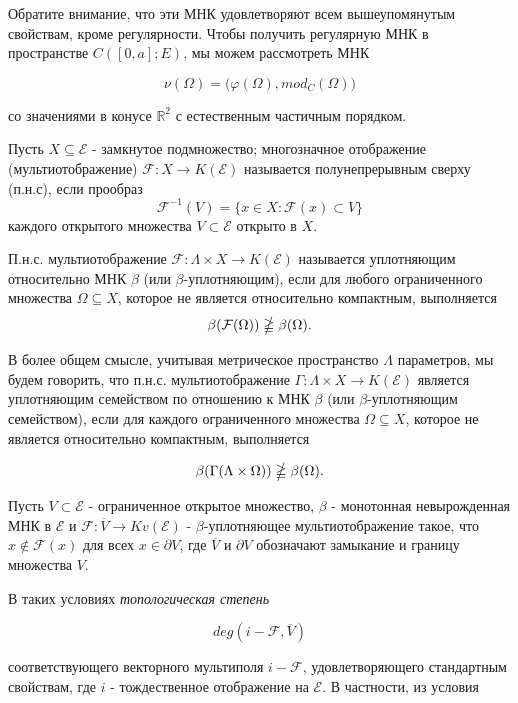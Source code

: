 Обратите внимание, что эти МНК удовлетворяют всем вышеупомянутым свойствам, кроме регулярности. Чтобы получить регулярную МНК
в пространстве $C([0, a]; E)$, мы можем рассмотреть МНК

$$\nu(\Omega) = \bigg( \varphi(\Omega),mod_{C}(\Omega) \bigg)$$

\noindent со значениями в конусе $\mathbb{R}^{2}$ с естественным частичным порядком.

\begin{definition}
    Пусть $X \subseteq \mathcal{E}$ - замкнутое подмножество; многозначное отображение (мультиотображение)
    $\mathcal{F}: X \rightarrow K(\mathcal{E})$ называется полунепрерывным сверху (п.н.с), если прообраз
    $$\mathcal{F}^{-1}(V) = \{x \in X: \mathcal{F}(x) \subset V\}$$
    каждого открытого множества $V \subset \mathcal{E}$ открыто в $X$.
\end{definition}

\begin{definition}
    П.н.с. мультиотображение $\mathcal{F}: \Lambda \times X \rightarrow K(\mathcal{E})$ называется уплотняющим относительно
    МНК $\beta$ (или $\beta$-уплотняющим), если для любого ограниченного множества $\Omega \subseteq X$, которое не является относительно
    компактным, выполняется
    $$\beta(\mathcal{F}(\Omega)) \ngeqq \beta(\Omega).$$
\end{definition}

В более общем смысле, учитывая метрическое пространство $\Lambda$ параметров, мы будем говорить, что п.н.с. мультиотображение
$\Gamma: \Lambda \times X \rightarrow K(\mathcal{E})$ является уплотняющим семейством по отношению к МНК $\beta$ (или $\beta$-уплотняющим
семейством), если для каждого ограниченного множества $\Omega \subseteq X$, которое не является относительно компактным, выполняется

$$\beta(\Gamma(\Lambda \times \Omega)) \ngeqq \beta(\Omega).$$

Пусть $V \subset \mathcal{E}$ - ограниченное открытое множество, $\beta$ - монотонная невырожденная МНК в $\mathcal{E}$
и $\mathcal{F}: \overline{V} \rightarrow Kv(\mathcal{E})$ - $\beta$-уплотняющее мультиотображение такое, что $x \notin \mathcal{F}(x)$
для всех $x \in \partial V$, где $\overline{V}$ и $\partial V$ обозначают замыкание и границу множества $V$.

В таких условиях \textit{топологическая степень}

$$deg(i - \mathcal{F}, \overline{V})$$

\noindent соответствующего векторного мультиполя $i - \mathcal{F}$, удовлетворяющего стандартным свойствам, где $i$ -
тождественное отображение на $\mathcal{E}$. В частности, из условия

